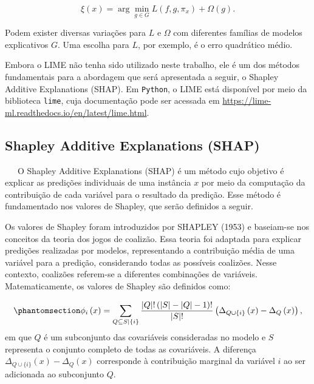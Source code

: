 \documentclass[
  12pt,
  a4paper,
]{scrreprt}
\begin{document}
\[
\xi\left(x\right) = \arg \min_{g \in G} L\left(f, g, \pi_x\right) + \Omega\left(g\right)\text{.}
\]

Podem exister diversas variações para \(L\) e \(\Omega\) com diferentes
famílias de modelos explicativos \(G\). Uma escolha para \(L\), por
exemplo, é o erro quadrático médio.

\vspace{12pt}

Embora o LIME não tenha sido utilizado neste trabalho, ele é um dos
métodos fundamentais para a abordagem que será apresentada a seguir, o
Shapley Additive Explanations (SHAP). Em \texttt{Python}, o LIME está
disponível por meio da biblioteca \texttt{lime}, cuja documentação pode
ser acessada em
\url{https://lime-ml.readthedocs.io/en/latest/lime.html}.

\subsection{Shapley Additive Explanations
(SHAP)}\label{shapley-additive-explanations-shap}

~~~O Shapley Additive Explanations (SHAP) é um método cujo objetivo é
explicar as predições individuais de uma instância \(x\) por meio da
computação da contribuição de cada variável para o resultado da
predição. Esse método é fundamentado nos valores de Shapley, que serão
definidos a seguir.

\vspace{12pt}

Os valores de Shapley foram introduzidos por SHAPLEY (1953) e baseiam-se
nos conceitos da teoria dos jogos de coalizão. Essa teoria foi adaptada
para explicar predições realizadas por modelos, representando a
contribuição média de uma variável para a predição, considerando todas
as possíveis coalizões. Nesse contexto, coalizões referem-se a
diferentes combinações de variáveis. Matematicamente, os valores de
Shapley são definidos como:

\begin{equation}\phantomsection\label{eq-shapley}{
\phi_i\left(x\right) = \sum_{Q \subseteq S | \{i\}} \frac{|Q|!\left(|S| - |Q| - 1\right)!}{|S|!} \left(\Delta_{Q\cup \{i\}}\left(x\right) - \Delta_{Q}\left(x\right)\right)\text{,}
}\end{equation} em que \(Q\) é um subconjunto das covariáveis
consideradas no modelo e \(S\) representa o conjunto completo de todas
as covariáveis. A diferença
\(\Delta_{Q \cup \{i\}}\left(x\right) - \Delta_{Q}\left(x\right)\)
corresponde à contribuição marginal da variável \(i\) ao ser adicionada
ao subconjunto \(Q\).
\end{document}
